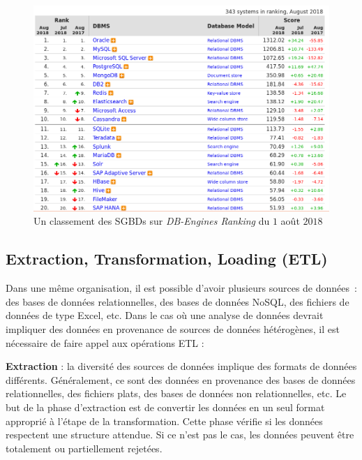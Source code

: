		\begin{figure}[h]
			\centering
			\captionsetup{justification=centering}
			\includegraphics[width=1\linewidth]{illustrations/ranking-db}
			\caption{Un classement des SGBDs sur \textit{DB-Engines Ranking} du $1$ août $2018$ }
			\label{fig:ranking-db}
		\end{figure}
		
		\subsection{Extraction, Transformation, Loading (ETL)} \label{sec:etl}
		Dans une même organisation, il est possible d'avoir plusieurs sources de données~: des bases de données relationnelles, des bases de données NoSQL, des fichiers de données de type Excel, etc. 
		Dans le cas où une analyse de données devrait impliquer des données en provenance de  sources  de données hétérogènes, il est nécessaire de faire appel aux opérations ETL :
		
		\textbf{Extraction} :  la diversité des sources de données implique des formats de données différents. Généralement, ce sont des données en provenance des bases de données relationnelles, des fichiers plats, des bases de données non relationnelles,  etc. Le but de la phase d'extraction est de convertir les données en un seul format approprié à l'étape de la transformation. Cette phase  vérifie si les données respectent  une structure attendue. Si ce n'est pas le cas, les données peuvent être totalement ou partiellement rejetées.
		

